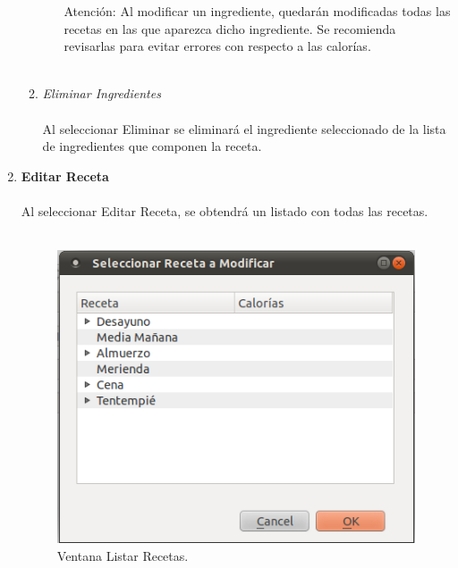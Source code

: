 \begin{enumerate}
\begin{enumerate}
\begin{enumerate}
Atención: Al modificar un ingrediente, quedarán modificadas todas las recetas en las que aparezca dicho ingrediente. Se recomienda revisarlas para evitar errores con respecto a las calorías.\\\\
\end{enumerate}
\item \textit{Eliminar Ingredientes}\\\\
Al seleccionar Eliminar se eliminará el ingrediente seleccionado de la lista de ingredientes que componen la receta.
\end{enumerate}
\item \textbf{Editar Receta}\\\\
Al seleccionar Editar Receta, se obtendrá un listado con todas las recetas.\\\\
\begin{figure}[H]
  \label{listado_recetas}
  \begin{center}
    \includegraphics[scale=0.5]{../../Image/receta-modificar.png}
  \end{center}
  \caption{Ventana Listar Recetas.}
\end{figure}


\end{enumerate}
